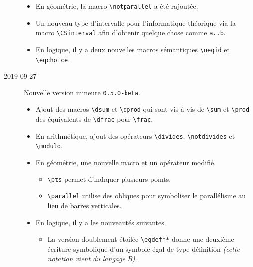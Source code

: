 \documentclass[12pt,a4paper]{article}
\newcommand\env[1]{\texttt{#1}}
\newcommand\macro[1]{\env{\textbackslash{}#1}}
\theoremstyle{definition}
\begin{document}
\begin{description}
\begin{itemize}[itemsep=.5em]
        \item En géométrie, la macro \macro{notparallel} a été rajoutée.
    
    
        \item Un nouveau type d'intervalle pour l'informatique théorique via la macro \macro{CSinterval} afin d'obtenir quelque chose comme \verb+a..b+.
    
    
        \item En logique, il y a deux nouvelles macros sémantiques \macro{neqid} et \macro{eqchoice}.
    \end{itemize}


    \medskip
    \item[2019-09-27] Nouvelle version mineure \verb+0.5.0-beta+.
    
    \begin{itemize}[itemsep=.5em]
        \item Ajout des macros \macro{dsum} et \macro{dprod} qui sont vis à vis de \macro{sum} et \macro{prod} des équivalents de \macro{dfrac} pour \macro{frac}.
    
    
        \item En arithmétique, ajout des opérateurs \macro{divides}, \macro{notdivides} et \macro{modulo}.
    
    
        \item En géométrie, une nouvelle macro et un opérateur modifié.
        \begin{itemize}[itemsep=.5em]
            \item \macro{pts} permet d'indiquer plusieurs points.
    
            \item \macro{parallel} utilise des obliques pour symboliser le parallélisme au lieu de barres verticales.
        \end{itemize}
    
    
        \item En logique, il y a les nouveautés suivantes.
        \begin{itemize}[itemsep=.5em]
            \item La version doublement étoilée \macro{eqdef**} donne une deuxième écriture symbolique d'un symbole égal de type définition \emph{(cette notation vient du langage B)}.
    

\end{itemize}
\end{itemize}
\end{description}
\end{document}
